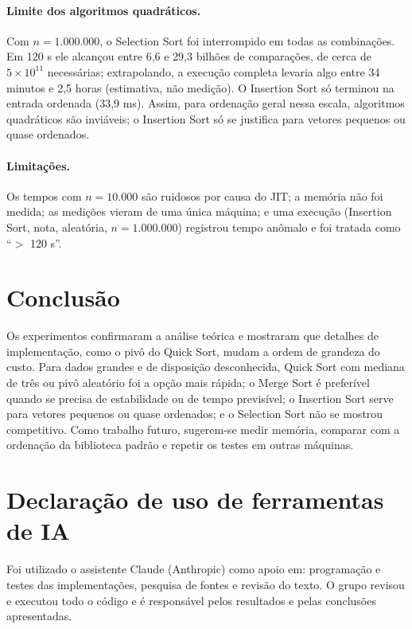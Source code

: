 \documentclass[12pt]{article}
\begin{document}
\paragraph{Limite dos algoritmos quadr\'aticos.} Com $n=1.000.000$, o Selection Sort foi interrompido em todas as combina\c{c}\~oes. Em 120 s ele alcan\c{c}ou entre 6,6 e 29,3 bilh\~oes de compara\c{c}\~oes, de cerca de $5\times10^{11}$ necess\'arias; extrapolando, a execu\c{c}\~ao completa levaria algo entre 34 minutos e 2,5 horas (estimativa, n\~ao medi\c{c}\~ao). O Insertion Sort s\'o terminou na entrada ordenada (33,9 ms). Assim, para ordena\c{c}\~ao geral nessa escala, algoritmos quadr\'aticos s\~ao invi\'aveis; o Insertion Sort s\'o se justifica para vetores pequenos ou quase ordenados.

\paragraph{Limita\c{c}\~oes.} Os tempos com $n=10.000$ s\~ao ruidosos por causa do JIT; a mem\'oria n\~ao foi medida; as medi\c{c}\~oes vieram de uma \'unica m\'aquina; e uma execu\c{c}\~ao (Insertion Sort, nota, aleat\'oria, $n=1.000.000$) registrou tempo an\^omalo e foi tratada como ``$>$ 120 s''.

\section{Conclus\~ao}

Os experimentos confirmaram a an\'alise te\'orica e mostraram que detalhes de implementa\c{c}\~ao, como o piv\^o do Quick Sort, mudam a ordem de grandeza do custo. Para dados grandes e de disposi\c{c}\~ao desconhecida, Quick Sort com mediana de tr\^es ou piv\^o aleat\'orio foi a op\c{c}\~ao mais r\'apida; o Merge Sort \'e prefer\'ivel quando se precisa de estabilidade ou de tempo previs\'ivel; o Insertion Sort serve para vetores pequenos ou quase ordenados; e o Selection Sort n\~ao se mostrou competitivo. Como trabalho futuro, sugerem-se medir mem\'oria, comparar com a ordena\c{c}\~ao da biblioteca padr\~ao e repetir os testes em outras m\'aquinas.

\section*{Declara\c{c}\~ao de uso de ferramentas de IA}

Foi utilizado o assistente Claude (Anthropic) como apoio em: programa\c{c}\~ao e testes das implementa\c{c}\~oes, pesquisa de fontes e revis\~ao do texto. O grupo revisou e executou todo o c\'odigo e \'e respons\'avel pelos resultados e pelas conclus\~oes apresentadas.



\end{document}
